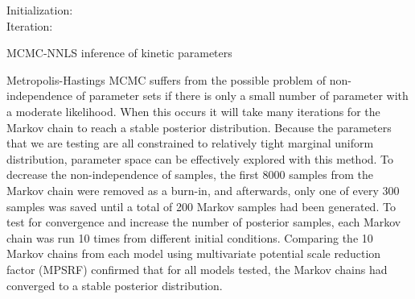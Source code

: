 \begin{algorithm}[H]\vspace{2mm}
 \vspace{2mm}
 Initialization:\\
Iteration:\\
\vspace{2mm}
\caption{MCMC-NNLS inference of kinetic parameters}
\label{MCMCalg}
\end{algorithm}

Metropolis-Hastings MCMC suffers from the possible problem of non-independence of parameter sets if there is only a small number of parameter with a moderate likelihood.  When this occurs it will take many iterations for the Markov chain to reach a stable posterior distribution.  Because the parameters that we are testing are all constrained to relatively tight marginal uniform distribution, parameter space can be effectively explored with this method.  To decrease the non-independence of samples, the first 8000 samples from the Markov chain were removed as a burn-in, and afterwards, only one of every 300 samples was saved until a total of 200 Markov samples had been generated.  To test for convergence and increase the number of posterior samples, each Markov chain was run 10 times from different initial conditions.  Comparing the 10 Markov chains from each model using multivariate potential scale reduction factor (MPSRF)\cite{Brooks:1997um} confirmed that for all models tested, the Markov chains had converged to a stable posterior distribution.


